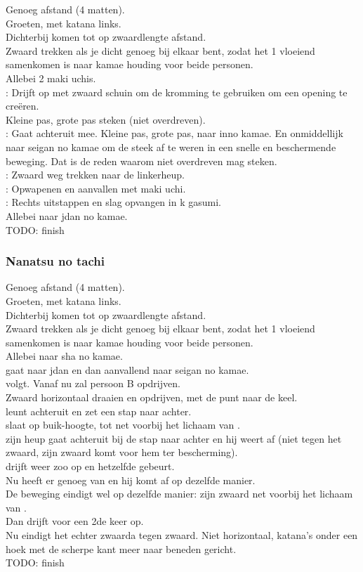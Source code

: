 Genoeg afstand (4 matten).\\
Groeten, met katana links.\\
Dichterbij komen tot op zwaardlengte afstand.\\
Zwaard trekken als je dicht genoeg bij elkaar bent, zodat het 1 vloeiend samenkomen is naar kamae houding voor beide personen.\\
Allebei 2 maki uchis.\\
\pA: Drijft op met zwaard schuin om de kromming te gebruiken om een opening te cre\"{e}ren.\\
Kleine pas, grote pas steken (niet overdreven).\\
\pB: Gaat achteruit mee. Kleine pas, grote pas, naar inno kamae. En onmiddellijk naar seigan no kamae om de steek af te weren in een snelle en beschermende beweging. Dat is de reden waarom \pa niet overdreven mag steken.\\
\pA: Zwaard weg trekken naar de linkerheup.\\
\pB: Opwapenen en aanvallen met maki uchi.\\
\pA: Rechts uitstappen en slag opvangen in k gasumi.\\
Allebei naar jdan no kamae.\\
TODO: finish

\subsubsection{Nanatsu no tachi}

Genoeg afstand (4 matten).\\
Groeten, met katana links.\\
Dichterbij komen tot op zwaardlengte afstand.\\
Zwaard trekken als je dicht genoeg bij elkaar bent, zodat het 1 vloeiend samenkomen is naar kamae houding voor beide personen.\\
Allebei naar sha no kamae.\\
\pA gaat naar jdan en dan aanvallend naar seigan no kamae.\\
\pB volgt. Vanaf nu zal persoon B opdrijven.\\
Zwaard horizontaal draaien en opdrijven, met de punt naar de keel.\\
\pA leunt achteruit en zet een stap naar achter.\\
\pB slaat op buik-hoogte, tot net voorbij het lichaam van \pa.\\
\pA zijn heup gaat achteruit bij de stap naar achter en hij weert af (niet tegen het zwaard, zijn zwaard komt voor hem ter bescherming).\\
\pB drijft weer zoo op en hetzelfde gebeurt.\\
Nu heeft \pa er genoeg van en hij komt af op dezelfde manier.\\
De beweging eindigt wel op dezelfde manier: \pb zijn zwaard net voorbij het lichaam van \pa.\\
Dan drijft \pa voor een 2de keer op.\\
Nu eindigt het echter zwaarda tegen zwaard. Niet horizontaal, katana's onder een hoek met de scherpe kant meer naar beneden gericht.\\
TODO: finish

